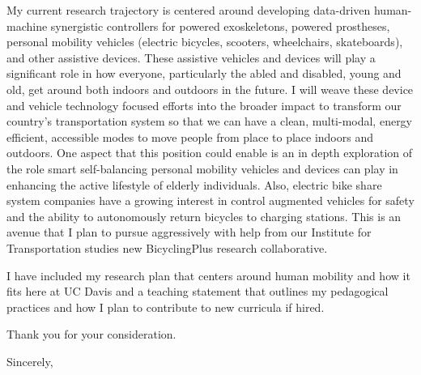 \documentclass{letter}
\begin{document}
\begin{letter}
My current research trajectory is centered around developing data-driven
human-machine synergistic controllers for powered exoskeletons, powered
prostheses, personal mobility vehicles (electric bicycles, scooters,
wheelchairs, skateboards), and other assistive devices. These assistive
vehicles and devices will play a significant role in how everyone, particularly
the abled and disabled, young and old, get around both indoors and outdoors in
the future. I will weave these device and vehicle technology focused efforts
into the broader impact to transform our country's transportation system so
that we can have a clean, multi-modal, energy efficient, accessible modes to
move people from place to place indoors and outdoors. One aspect that this
position could enable is an in depth exploration of the role smart
self-balancing personal mobility vehicles and devices can play in enhancing the
active lifestyle of elderly individuals. Also, electric bike share system
companies have a growing interest in control augmented vehicles for safety and
the ability to autonomously return bicycles to charging stations. This is an
avenue that I plan to pursue aggressively with help from our Institute for
Transportation studies new BicyclingPlus research collaborative.

I have included my research plan that centers around human mobility and how it
fits here at UC Davis and a teaching statement that outlines my pedagogical
practices and how I plan to contribute to new curricula if hired.

Thank you for your consideration.

\closing{Sincerely,}

\end{letter}
\end{document}
